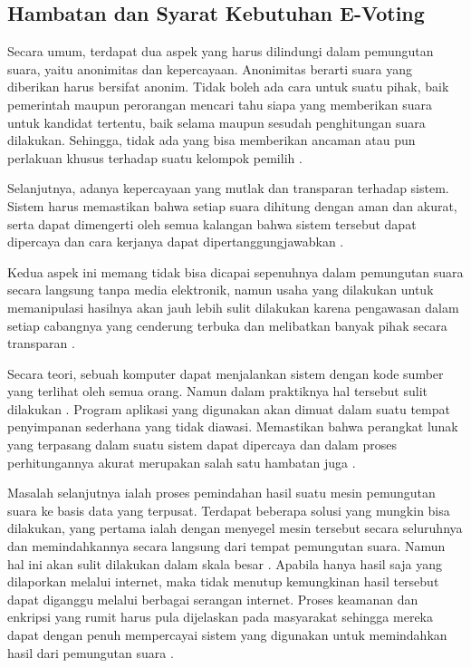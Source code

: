 \documentclass[12pt, a4paper, final]{article}
\begin{document}
\subsection{Hambatan dan Syarat Kebutuhan E-Voting}

Secara umum, terdapat dua aspek yang harus dilindungi dalam pemungutan suara, yaitu anonimitas dan kepercayaan. Anonimitas berarti suara yang diberikan harus bersifat anonim. Tidak boleh ada cara untuk suatu pihak, baik pemerintah maupun perorangan mencari tahu siapa yang memberikan suara untuk kandidat tertentu, baik selama maupun sesudah penghitungan suara dilakukan. Sehingga, tidak ada yang bisa memberikan ancaman atau pun perlakuan khusus terhadap suatu kelompok pemilih \citep{sysreview}.

Selanjutnya, adanya kepercayaan yang mutlak dan transparan terhadap sistem. Sistem harus memastikan bahwa setiap suara dihitung dengan aman dan akurat, serta dapat dimengerti oleh semua kalangan bahwa sistem tersebut dapat dipercaya dan cara kerjanya dapat dipertanggungjawabkan \citep{wang2017review}.

Kedua aspek ini memang tidak bisa dicapai sepenuhnya dalam pemungutan suara secara langsung tanpa media elektronik, namun usaha yang dilakukan untuk memanipulasi hasilnya akan jauh lebih sulit dilakukan karena pengawasan dalam setiap cabangnya yang cenderung terbuka dan melibatkan banyak pihak secara transparan \citep{wang2017review}.

Secara teori, sebuah komputer dapat menjalankan sistem dengan kode sumber yang terlihat oleh semua orang. Namun dalam praktiknya hal tersebut sulit dilakukan \cite{10.1007/3-540-57220-1_66}. Program aplikasi yang digunakan akan dimuat dalam suatu tempat penyimpanan sederhana yang tidak diawasi. Memastikan bahwa perangkat lunak yang terpasang dalam suatu sistem dapat dipercaya dan dalam proses perhitungannya akurat merupakan salah satu hambatan juga \citep{7571928}.

Masalah selanjutnya ialah proses pemindahan hasil suatu mesin pemungutan suara ke basis data yang terpusat. Terdapat beberapa solusi yang mungkin bisa dilakukan, yang pertama ialah dengan menyegel mesin tersebut secara seluruhnya dan memindahkannya secara langsung dari tempat pemungutan suara. Namun hal ini akan sulit dilakukan dalam skala besar \citep{sysreview}. Apabila hanya hasil saja yang dilaporkan melalui internet, maka tidak menutup kemungkinan hasil tersebut dapat diganggu melalui berbagai serangan internet. Proses keamanan dan enkripsi yang rumit harus pula dijelaskan pada masyarakat sehingga mereka dapat dengan penuh mempercayai sistem yang digunakan untuk memindahkan hasil dari pemungutan suara \citep{reviewevote}.
\end{document}

